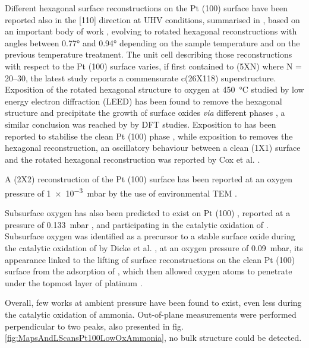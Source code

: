 Different hexagonal surface reconstructions on the Pt (100) surface have been reported also in the [110] direction at UHV conditions, summarised in \cite{Hammer2016}, based on an important body of work \parencite{Heilmann1979, VANHOVE1981, Heinz1982, Mase1992, Kuhnke1992, Borg1994, VanBeurden2004, Havu2010}, evolving to rotated hexagonal reconstructions with angles between \ang{0.77} and \ang{0.94} depending on the sample temperature and on the previous temperature treatment.
The unit cell describing those reconstructions with respect to the Pt (100) surface varies, if first contained to (5XN) where N = 20–30, the latest study reports a commensurate c(26X118) superstructure.
Exposition of the rotated hexagonal structure to oxygen at \qty{450}{\degreeCelsius} studied by low energy electron diffraction (LEED) has been found to remove the hexagonal structure and precipitate the growth of surface oxides \textit{via} different phases \parencite{BradleyShumbera2007, BradleyShumbera2007a}, a similar conclusion was reached by \cite{Deskins2005} by DFT studies.
Exposition to  has been reported to stabilise the clean Pt (100) phase \parencite{Heinz1982}, while exposition to  removes the hexagonal reconstruction, an oscillatory behaviour between a clean (1X1) surface and the rotated hexagonal reconstruction was reported by Cox et al. \parencite*{Cox1983}.

A (2X2) reconstruction of the Pt (100) surface has been reported at an oxygen pressure of \qty{1e-3}{mbar} by the use of environmental TEM \parencite{Li2016}.

Subsurface oxygen has also been predicted to exist on Pt (100) \parencite{Gu2007}, reported at a pressure of \qty{0.133}{\milli\bar} \parencite{McMillan2005}, and participating in the catalytic oxidation of .
Subsurface oxygen was identified as a precursor to a stable surface oxide during the catalytic oxidation of  by Dicke et al. \parencite*{Dicke2000}, at an oxygen pressure of \qty{0.09}{\milli\bar}, its appearance linked to the lifting of surface reconstructions on the clean Pt (100) surface from the adsorption of , which then allowed oxygen atoms to penetrate under the topmost layer of platinum \parencite{Rotermund1993, LAUTERBACH1994}.

Overall, few works at ambient pressure have been found to exist, even less during the catalytic oxidation of ammonia.
Out-of-plane measurements were performed perpendicular to two peaks, also presented in fig. \ref{fig:MapsAndLScansPt100LowOxAmmonia}, no bulk structure could be detected.

